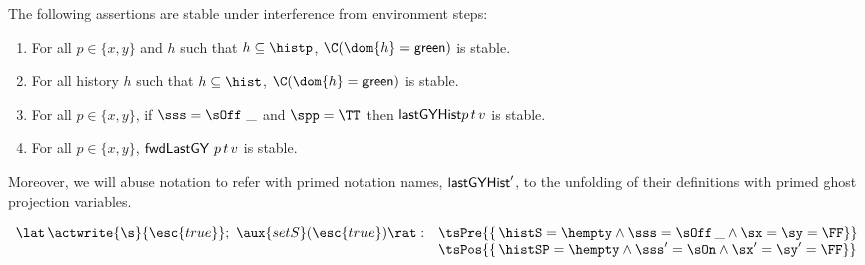 \begin{lemma}\label{lem:menvs-scan}
The following assertions are stable under interference from
environment steps:
\begin{enumerate}
 \item \label{lem:menvs:green-phist} For all $p \in \{ x, y \}$ and
   $h$ such that $ h \subseteq \histp $, $ \C(\dom{h} =
   \mathsf{green})$ is stable.

 \item\label{lem:menvs:green-subhist} For all history $h$ such that $ h
   \subseteq \hist$, $\C(\dom{h} = \sf{green})$ is stable.

 \item \label{lem:menvs:some-lgVy} For all $p \in \{x, y \}$, if $\sss
   = \sOff\ \_$ and $\spp = \TT$ then ${\mathsf{lastGYHist}} p\, t\, v$ is stable.

 \item \label{lem:menvs:none-lgVy} For all $p \in \{x, y\}$,
   ${\mathsf{fwdLastGY}}\ p\, t\, v$ is stable.
\end{enumerate}
Moreover, we will abuse notation to refer with primed notation names,
\eg ${\mathsf{lastGYHist}}'$, to the unfolding of their definitions with primed
ghost projection variables.
\end{lemma}




\[
\!\begin{array}{r l}
  \lat\,\actwrite{\s}{\esc{true}};\ \aux{setS}(\esc{true}) \rat: &
     \tsPre{\{\, \histS = \hempty \wedge
       \sss = \sOff\, \_ \wedge \sx = \sy = \FF \}} \\
     & \tsPos{\{\, \histSP = \hempty \wedge
       \sss' = \sOn \wedge \sx' = \sy' = \FF \}}
\end{array}
\]

